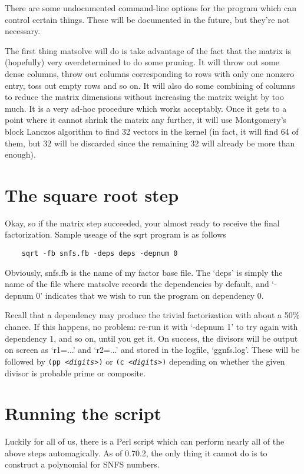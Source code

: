 \documentclass[12pt]{article}
\begin{document}
  There are some undocumented command-line options for the program
  which can control certain things. These will be documented in the
  future, but they're not necessary.

  The first thing matsolve will do is take advantage of the fact 
  that the matrix is (hopefully) very overdetermined to do some
  pruning. It will throw out some dense columns, throw out columns
  corresponding to rows with only one nonzero entry, toss out empty
  rows and so on. It will also do some combining of columns to reduce
  the matrix dimensions without increasing the matrix weight by too 
  much. It is a very ad-hoc procedure which works acceptably. Once
  it gets to a point where it cannot shrink the matrix any further,
  it will use Montgomery's block Lanczos algorithm \cite{Montgomery1995}
  to find 32 vectors in the kernel (in fact, it will find 64 of them,
  but 32 will be discarded since the remaining 32 will already be more
  than enough).

\section{The square root step}
  Okay, so if the matrix step succeeded, your almost ready to
  receive the final factorization. Sample useage of the
  sqrt program is as follows
  \begin{verbatim} 
    sqrt -fb snfs.fb -deps deps -depnum 0
  \end{verbatim}
  Obviously, snfs.fb is the name of my factor base file. The
  `deps' is simply the name of the file where matsolve records
  the dependencies by default, and `-depnum 0' indicates that
  we wish to run the program on dependency 0.

  Recall that a dependency may produce the trivial factorization
  with about a 50\% chance. If this happens, no problem:
  re-run it with `-depnum 1' to try again with dependency 1,
  and so on, until you get it. On success, the divisors will
  be output on screen as `r1=...' and `r2=...' and stored in
  the logfile, `ggnfs.log'. These will be followed by 
  {\tt (pp {\it <digits>})} or
  {\tt (c {\it <digits>})} depending on whether the given
  divisor is probable prime or composite.


\section{Running the script}
  Luckily for all of us, there is a Perl script which can
  perform nearly all of the above steps automagically.
  As of 0.70.2, the only thing it cannot do is to construct
  a polynomial for SNFS numbers.
\end{document}
